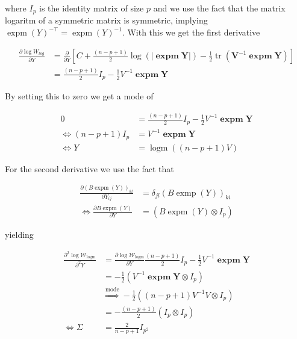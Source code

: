 where $I_p$ is the identity matrix of size $p$ and we use the fact that the matrix logaritm of a symmetric matrix is symmetric, implying $\operatorname{expm}(Y)^{-\top} = \operatorname{expm}(Y)^{-1}$. With this we get the first derivative

\begin{subequations}
\begin{align}
	\frac{\partial \log W_{log}}{\partial Y} &= \frac{\partial}{\partial Y} \left[C + \frac{(n-p+1)}{2} \log(\left|\mathbf{\operatorname{expm}Y}\right|)  - \frac{1}{2}\operatorname{tr}({\mathbf V}^{-1}\mathbf{\operatorname{expm}Y}) \right] \\
	&=  \frac{(n-p+1)}{2} I_p - \frac{1}{2}V^{-1}\mathbf{\operatorname{expm}Y} 
\end{align}
\end{subequations}

By setting this to zero we get a mode of

\begin{subequations}
\begin{align}
	0 &=  \frac{(n-p+1)}{2} I_p - \frac{1}{2}V^{-1}\mathbf{\operatorname{expm}Y} \\
	\Leftrightarrow (n-p+1)I_p &= V^{-1}\mathbf{\operatorname{expm}Y} \\
	\Leftrightarrow Y &= \operatorname{logm}((n-p+1)V)
\end{align}
\end{subequations}

For the second derivative we use the fact that

\begin{subequations}
\begin{align}
	\frac{\partial (B\operatorname{expm}(Y))_{kl}}{\partial Y_{ij}} &= \delta_{jl}(B\operatorname{exmp}(Y))_{ki} \\
	\Leftrightarrow \frac{\partial B\operatorname{expm}(Y)}{\partial Y} &= \left(B\operatorname{expm}(Y) \otimes I_p\right)
\end{align}
\end{subequations}

yielding

\begin{subequations}
\begin{align}
	\frac{\partial^2 \log \mathcal{W}_{\text{logm}}}{\partial^2 Y} &= \frac{\partial \log \mathcal{W}_{\text{logm}}}{\partial Y}  \frac{(n-p+1)}{2} I_p - \frac{1}{2}V^{-1}\mathbf{\operatorname{expm}Y} \\
	&= -\frac{1}{2}(V^{-1}\mathbf{\operatorname{expm}Y} \otimes I_p) \\
	&\overset{\text{mode}}{\Rightarrow} -\frac{1}{2}((n-p+1)V^{-1}V \otimes I_p) \\
	&= -\frac{(n-p+1)}{2} (I_p \otimes I_p)\\
	\Leftrightarrow \Sigma &= \frac{2}{n-p+1} I_{p^2}
\end{align}
\end{subequations}

